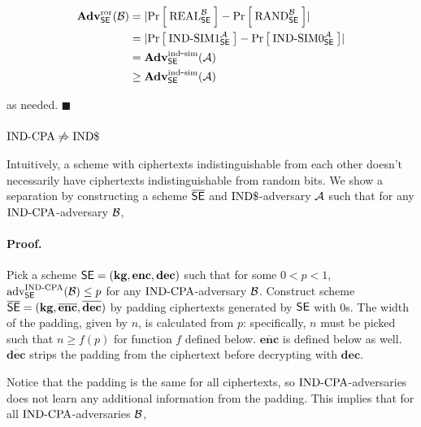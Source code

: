 \begin{align*}
  \mathbf{Adv}^{\mathrm{ror}}_{\textnormal{\textsf{SE}}}({\mathcal B}) &=
  \lvert\Pr\left[\: \textnormal{REAL}^{{\mathcal B}}_{\textnormal{\textsf{SE}}} \:\right] - \Pr\left[\: \textnormal{RAND}^{{\mathcal B}}_{\textnormal{\textsf{SE}}} \:\right]\rvert \\
  &= \lvert\Pr\left[\: \textnormal{IND-SIM}1^{{\mathcal A}}_{\textnormal{\textsf{SE}}} \:\right] - \Pr\left[\: \textnormal{IND-SIM}0^{{\mathcal A}}_{\textnormal{\textsf{SE}}} \:\right]\rvert \\
  &= \mathbf{Adv}^{\mathrm{ind\mbox{-} sim}}_{\textnormal{\textsf{SE}}}({\mathcal A}) \\
  &\geq \mathbf{Adv}^{\mathrm{ind\mbox{-} sim}}_{\textnormal{\textsf{SE}}}({\mathcal A})
\end{align*}

as needed. $\blacksquare$

\subsubsection*{$\textnormal{IND-CPA} \not\Rightarrow \textnormal{IND\$}$}

Intuitively, a scheme with ciphertexts indistinguishable from each other
doesn't necessarily have ciphertexts indistinguishable from random bits.
We show a separation by constructing a scheme $\overline{\textnormal{\textsf{SE}}}$ and
$\textnormal{IND\$}$-adversary ${\mathcal A}$ such that for any $\textnormal{IND-CPA}$-adversary ${\mathcal B}$,

\bnm
\AdvROR{\overline{\SEscheme}}{\advA} \geq
\AdvINDCPA{\overline{\SEscheme}}{\advB}
\enm

\paragraph{Proof.}

Pick a scheme $\textnormal{\textsf{SE}} = (\textbf{kg},\textbf{enc},\textbf{dec})$
such that for some $0 < p < 1$, $\textnormal{adv}_{\textnormal{\textsf{SE}}}^{\textnormal{IND-CPA}}({\mathcal B}) \leq p$
for any $\textnormal{IND-CPA}$-adversary ${\mathcal B}$.
Construct scheme
$\overline{\textnormal{\textsf{SE}}} = (\textbf{kg},\overline{\textbf{enc}},\overline{\textbf{dec}})$
by padding ciphertexts generated by $\textnormal{\textsf{SE}}$ with 0s. The width of the
padding, given by $n$, is calculated from $p$: specifically, $n$ must be picked
such that $n \geq f(p)$ for function $f$ defined below.
$\overline{\textbf{enc}}$ is defined below as well.
$\overline{\textbf{dec}}$ strips the padding from the ciphertext before
decrypting with $\textbf{dec}$.


Notice that the padding is the same for all ciphertexts, so
$\textnormal{IND-CPA}$-adversaries does not learn any additional information from the
padding. This implies that for all $\textnormal{IND-CPA}$-adversaries ${\mathcal B}$,

